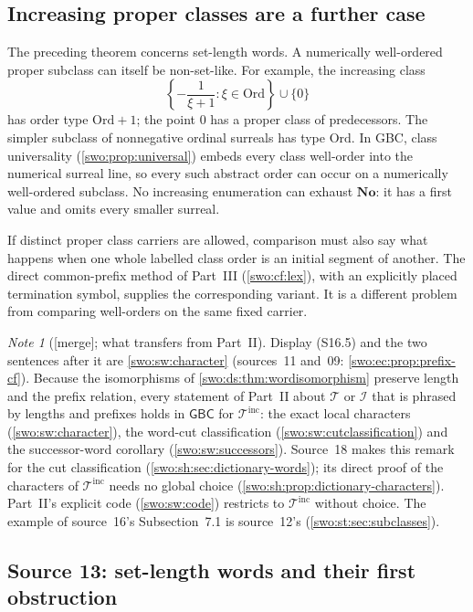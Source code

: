 \documentclass[11pt]{article}
\theoremstyle{definition}
\theoremstyle{remark}
\newtheorem{note}[note]{Note}
\newcommand{\No}{\mathbf{No}}
\newcommand{\Ord}{\mathrm{Ord}}
\newcommand{\Words}{\mathcal I}
\newcommand{\WordsAll}{\mathcal T}
\newcommand{\GBC}{\mathsf{GBC}}
\newcommand{\merge}{\textsf{[merge]}}
\newcommand{\WordsInc}{\mathcal T^{\mathrm{inc}}}
\begin{document}
\subsection{Increasing proper classes are a further case}

The preceding theorem concerns set-length words. A numerically well-ordered
proper subclass can itself be non-set-like. For example, the increasing
class
\[
 \left\{-\frac1{\xi+1}:\xi\in\Ord\right\}\cup\{0\}
\]
has order type $\Ord+1$; the point $0$ has a proper class of predecessors.
The simpler subclass of nonnegative ordinal surreals has type $\Ord$.
In GBC, class universality (\cref{swo:prop:universal}) embeds every class well-order
into the numerical surreal line, so every such abstract order can occur
on a numerically well-ordered subclass. No increasing enumeration can
exhaust $\No$: it has a first value and omits every smaller surreal.

If distinct proper class carriers are allowed, comparison must also say
what happens when one whole labelled class order is an initial segment of
another. The direct common-prefix method of Part~III (\cref{swo:cf:lex}), with
an explicitly placed termination symbol, supplies the corresponding
variant. It is a different problem from comparing well-orders on the same
fixed carrier.

\begin{note}[\merge; what transfers from Part~II]\label{swo:vii:note:partII}
Display (S16.5) and the two sentences after it are \cref{swo:sw:character}
(sources~11 and~09: \cref{swo:ec:prop:prefix-cf}). Because the isomorphisms of
\cref{swo:ds:thm:wordisomorphism} preserve length and the prefix relation,
every statement of Part~II about $\WordsAll$ or $\Words$ that is phrased by
lengths and prefixes holds in $\GBC$ for $\WordsInc$: the exact local
characters (\cref{swo:sw:character}), the word-cut classification
(\cref{swo:sw:cutclassification}) and the successor-word corollary
(\cref{swo:sw:successors}). Source~18 makes this remark for the cut
classification (\cref{swo:sh:sec:dictionary-words}); its direct proof of the
characters of $\WordsInc$ needs no global choice
(\cref{swo:sh:prop:dictionary-characters}). Part~II's explicit code
(\cref{swo:sw:code}) restricts to $\WordsInc$ without choice. The example of
source~16's Subsection~7.1 is source~12's (\cref{swo:st:sec:subclasses}).
\end{note}

\subsection{Source 13: set-length words and their first obstruction}\label{swo:fs:sec:words}
\end{document}
